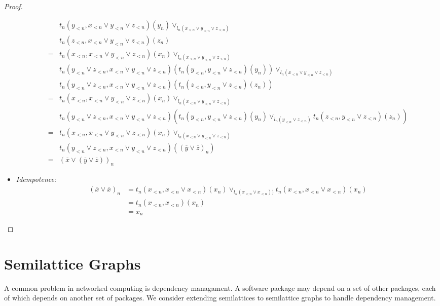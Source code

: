 \documentclass{article}
\begin{document}
\begin{proof}
\begin{itemize}
\begin{align*}
               & t_n(y_{<n}, x_{<n} \vee y_{<n} \vee z_{<n})(y_n) \vee_{l_n(x_{<n} \vee y_{<n} \vee z_{<n})} \\
               & t_n(z_{<n}, x_{<n} \vee y_{<n} \vee z_{<n})(z_n)  \\
              =& t_n(x_{<n}, x_{<n} \vee y_{<n} \vee z_{<n})(x_n) \vee_{l_n(x_{<n} \vee y_{<n} \vee z_{<n})} \\
               & t_n(y_{<n} \vee z_{<n}, x_{<n} \vee y_{<n} \vee z_{<n})(t_n(y_{<n}, y_{<n} \vee z_{<n})(y_n)) \vee_{l_n(x_{<n} \vee y_{<n} \vee z_{<n})} \\
               & t_n(y_{<n} \vee z_{<n}, x_{<n} \vee y_{<n} \vee z_{<n})(t_n(z_{<n}, y_{<n} \vee z_{<n})(z_n))  \\
              =& t_n(x_{<n}, x_{<n} \vee y_{<n} \vee z_{<n})(x_n) \vee_{l_n(x_{<n} \vee y_{<n} \vee z_{<n})} \\
               & t_n(y_{<n} \vee z_{<n}, x_{<n} \vee y_{<n} \vee z_{<n})(
                          t_n(y_{<n}, y_{<n} \vee z_{<n})(y_n) \vee_{l_n(y_{<n} \vee z_{<n})}
                          t_n(z_{<n}, y_{<n} \vee z_{<n})(z_n)) \\
              =& t_n(x_{<n}, x_{<n} \vee y_{<n} \vee z_{<n})(x_n) \vee_{l_n(x_{<n} \vee y_{<n} \vee z_{<n})} \\
               & t_n(y_{<n} \vee z_{<n}, x_{<n} \vee y_{<n} \vee z_{<n})((\overline{y} \vee \overline{z})_n) \\
              =& (\overline{x} \vee (\overline{y} \vee \overline{z}))_n
            \end{align*}
          \item \emph{Idempotence}:
            \begin{align*}
              (\overline{x} \vee \overline{x})_n &= t_n(x_{<n}, x_{<n} \vee x_{<n})(x_n) \vee_{l_n(x_{<n} \vee x_{<n}))} t_n(x_{<n}, x_{<n} \vee x_{<n})(x_n) \\
              &= t_n(x_{<n}, x_{<n})(x_n) \\
              &= x_n
            \end{align*}
        \end{itemize}
      \end{proof}

    \section{Semilattice Graphs}

        A common problem in networked computing is dependency managament. A software package may depend on a set of other packages, each of which depends on another set of packages. We consider extending semilattices to semilattice graphs to handle dependency management.
        
\end{document}
